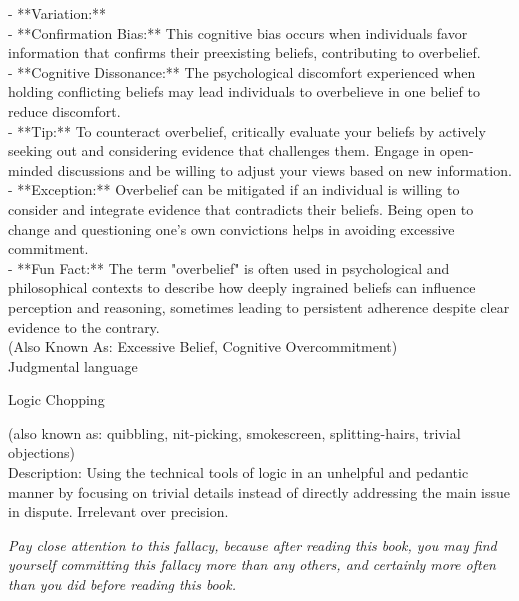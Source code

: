 \documentclass[a4paper,12pt,single,pdftex]{scrbook}
\begin{document}
    
      - **Variation:**
    \\

    
        - **Confirmation Bias:** This cognitive bias occurs when individuals favor information that confirms their preexisting beliefs, contributing to overbelief.
    \\

    
        - **Cognitive Dissonance:** The psychological discomfort experienced when holding conflicting beliefs may lead individuals to overbelieve in one belief to reduce discomfort.
    \\

    
      - **Tip:** To counteract overbelief, critically evaluate your beliefs by actively seeking out and considering evidence that challenges them. Engage in open-minded discussions and be willing to adjust your views based on new information.
    \\

    
      - **Exception:** Overbelief can be mitigated if an individual is willing to consider and integrate evidence that contradicts their beliefs. Being open to change and questioning one's own convictions helps in avoiding excessive commitment.
    \\

    
      - **Fun Fact:** The term "overbelief" is often used in psychological and philosophical contexts to describe how deeply ingrained beliefs can influence perception and reasoning, sometimes leading to persistent adherence despite clear evidence to the contrary.
    \\

  
    
      (Also Known As: Excessive Belief, Cognitive Overcommitment)
    \\

  

Judgmental language

Logic Chopping
    
      (also known as: quibbling, nit-picking, smokescreen, splitting-hairs, trivial objections)
    \\

  
    Description: Using the technical tools of logic in an unhelpful and pedantic manner by focusing on trivial details instead of directly addressing the main issue in dispute.  Irrelevant over precision.

    
      {\it Pay close attention to this fallacy, because after reading this book, you may find yourself committing this fallacy more than any others, and certainly more often than you did before reading this book.}
    \\
\end{document}
